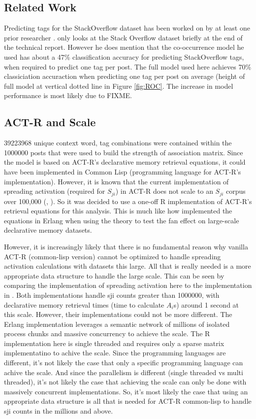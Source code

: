 \documentclass[10pt,letterpaper]{article}
\begin{document}
\subsection{Related Work}
Predicting tags for the StackOverflow dataset has been worked on by at least one prior researcher \cite{Kuo2011}.
 only looks at the Stack Overflow dataset briefly at the end of the technical report.
However he does mention that the co-occurrence model he used has about a 47\% classification accuracy for predicting StackOverflow tags, when required to predict one tag per post.
The full model used here achieves 70\% classiciation accuraction when predicting one tag per post on average (height of full model at vertical dotted line in Figure \ref{fig:ROC}.
The increase in model performance is most likely due to FIXME.

\subsection{ACT-R and Scale}
\num{39223968} unique context word, tag combinations were contained within the \num{1000000} posts that were used to build the strength of association matrix.
Since the model is based on ACT-R's declarative memory retrieval equations, it could have been implemented in Common Lisp (programming language for ACT-R's implementation).
However, it is known that the current implementation of spreading activation (required for $S_{ji}$) in ACT-R does not scale to an $S_{ji}$ corpus over 100,000 (, ).
So it was decided to use a one-off R implementation of ACT-R's retrieval equations for this analysis.
This is much like how  implemented the equations in Erlang when using the theory to test the fan effect on large-scale declarative memory datasets.

However, it is increasingly likely that there is no fundamental reason why vanilla ACT-R (common-lisp version) cannot be optimized to handle spreading activation calculations with datasets this large.
All that is really needed is a more appropriate data structure to handle the large scale.
This can be seen by comparing the implementation of spreading activation here to the implementation in .
Both implementations handle sji counts greater than \num{1000000}, with declarative memory retrieval times (time to calculate $A_i$s) around 1 second at this scale.
However, their implementations could not be more different.
The Erlang implementation leverages a semantic network of millions of isolated process chunks and massive concurrency to achieve the scale.
The R implementation here is single threaded and requires only a sparse matrix implementatino to achive the scale.
Since the programming languages are different, it's not likely the case that only a specific programming language can achive the scale.
And since the parallelism is different (single threaded vs multi threaded), it's not likely the case that achieving the scale can only be done with massively concurrent implementations.
So, it's most likely the case that using an appropriate data structure is all that is needed for ACT-R common-lisp to handle sji counts in the millions and above.
\end{document}
